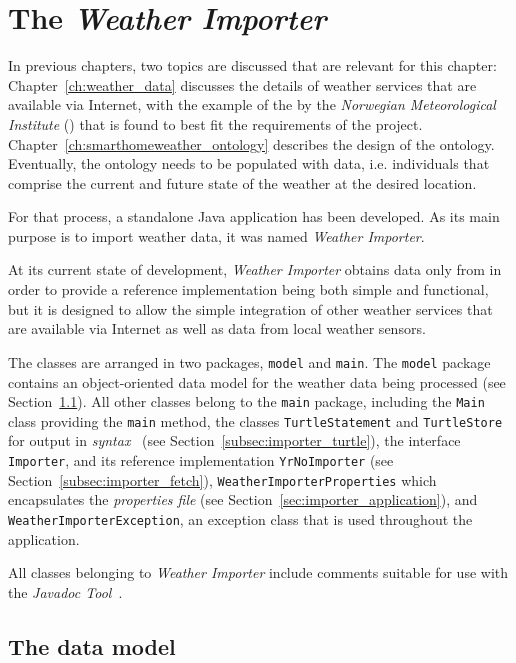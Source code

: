 \chapter{The \emph{Weather Importer}}
\label{ch:weather_importer}

In previous chapters, two topics are discussed that are relevant for this chapter: Chapter~\ref{ch:weather_data} discusses the details of weather services that are available via Internet, with the example of the  by the \emph{Norwegian Meteorological Institute} (\yrno) that is found to best fit the requirements of the \smarthomeweather project. Chapter~\ref{ch:smarthomeweather_ontology} describes the design of the \smarthomeweather ontology. Eventually, the ontology needs to be populated with data, i.e. individuals that comprise the current and future state of the weather at the desired location.

For that process, a standalone Java application has been developed. As its main purpose is to import weather data, it was named \emph{Weather Importer}.

At its current state of development, \emph{Weather Importer} obtains data only from \yrno in order to provide a reference implementation being both simple and functional, but it is designed to allow the simple integration of other weather services that are available via Internet as well as data from local weather sensors.

The classes are arranged in two packages, \texttt{model} and \texttt{main}. The \texttt{model} package contains an object-oriented data model for the weather data being processed (see Section~\ref{sec:importer_model}). All other classes belong to the \texttt{main} package, including the \texttt{Main} class providing the \texttt{main} method, the classes \texttt{TurtleStatement} and \texttt{TurtleStore} for output in \emph{ syntax}~\cite{Turtle} (see Section~\ref{subsec:importer_turtle}), the interface \texttt{Importer}, and its reference implementation \texttt{YrNoImporter} (see Section~\ref{subsec:importer_fetch}), \texttt{WeatherImporterProperties} which encapsulates the \emph{properties file} (see Section~\ref{sec:importer_application}), and \texttt{WeatherImporterException}, an exception class that is used throughout the application.

All classes belonging to \emph{Weather Importer} include comments suitable for use with the \emph{Javadoc Tool}~\cite{javadoc}.

\section{The data model}
\label{sec:importer_model}

